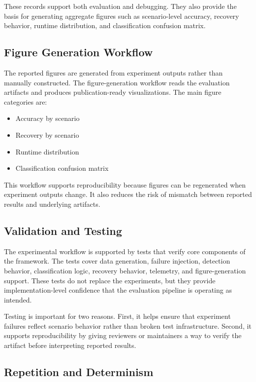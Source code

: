 These records support both evaluation and debugging. They also provide the basis for generating aggregate figures such as scenario-level accuracy, recovery behavior, runtime distribution, and classification confusion matrix.

\subsection{Figure Generation Workflow}

The reported figures are generated from experiment outputs rather than manually constructed. The figure-generation workflow reads the evaluation artifacts and produces publication-ready visualizations. The main figure categories are:

\begin{itemize}
    \item Accuracy by scenario
    \item Recovery by scenario
    \item Runtime distribution
    \item Classification confusion matrix
\end{itemize}

This workflow supports reproducibility because figures can be regenerated when experiment outputs change. It also reduces the risk of mismatch between reported results and underlying artifacts.

\subsection{Validation and Testing}

The experimental workflow is supported by tests that verify core components of the framework. The tests cover data generation, failure injection, detection behavior, classification logic, recovery behavior, telemetry, and figure-generation support. These tests do not replace the experiments, but they provide implementation-level confidence that the evaluation pipeline is operating as intended.

Testing is important for two reasons. First, it helps ensure that experiment failures reflect scenario behavior rather than broken test infrastructure. Second, it supports reproducibility by giving reviewers or maintainers a way to verify the artifact before interpreting reported results.

\subsection{Repetition and Determinism}

